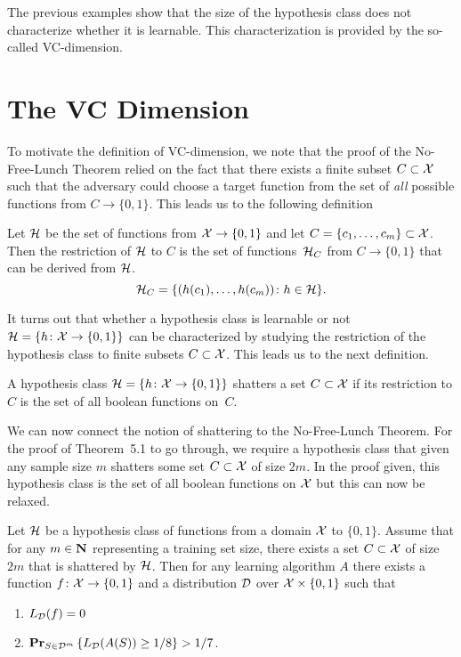 The previous examples show that the size of the hypothesis class does not characterize
whether it is learnable. This characterization is provided by the so-called VC-dimension.

\section{The VC Dimension}

To motivate the definition of VC-dimension, we note that the proof of the No-Free-Lunch
Theorem relied on the fact that there exists a finite subset $C \subset \mathcal{X}$ such
that the adversary could choose a target function from the set of \emph{all} possible
functions from $C \rightarrow \{0, 1\}$. This leads us to the following
definition
\begin{definition} Let $\mathcal{H}$ be the
set of functions from $\mathcal{X} \rightarrow \{0, 1\}$ and let
$C = \{c_1, \ldots, c_m\} \subset \mathcal{X}$. Then
the restriction of $\mathcal{H}$ to $C$ is the set of functions~$\mathcal{H}_C$
from $C \to \{0, 1\}$  that can be derived from $\mathcal{H}$.
\[
    \mathcal{H}_C = \{(h(c_1), \ldots, h(c_m)) \colon h \in \mathcal{H}\}.
\]
\end{definition}

It turns out that whether a hypothesis class is learnable or not
$\mathcal{H} = \{h \colon \mathcal{X} \rightarrow \{0, 1\} \}$ can be characterized
by studying the restriction of the hypothesis class to finite subsets
$C \subset \mathcal{X}$. This leads us to the next definition.
\begin{definition}[Shattering]
A hypothesis class $\mathcal{H} = \{h \colon \mathcal{X} \rightarrow \{0, 1\} \}$ shatters
a set $C \subset \mathcal{X}$ if its restriction to $C$ is the set of all boolean functions
on~$C$.
\end{definition}

We can now connect the notion of shattering to the No-Free-Lunch Theorem. For the
proof of Theorem~5.1 to go through, we require a hypothesis class that given
any sample size $m$ shatters some set $C \subset \mathcal{X}$ of size $2m$. In the proof
given, this hypothesis class is the set of all boolean functions on $\mathcal{X}$ but
this can now be relaxed.
\begin{corollary} \label{cor:no_free_lunch}
Let $\mathcal{H}$ be a hypothesis class of functions from a domain $\mathcal{X}$ to $\{0, 1\}$.
Assume that for any $m \in \mathbf{N}$ representing a training set size, there exists a
set $C \subset \mathcal{X}$ of size $2m$ that is shattered by $\mathcal{H}$. Then
for any learning algorithm $A$ there exists a function
$f \colon \mathcal{X} \rightarrow \{0, 1\}$ and a distribution $\mathcal{D}$ over
$\mathcal{X} \times \{0, 1\}$ such that
\begin{enumerate}
    \item $L_{\mathcal{D}} (f) = 0$
    \item $\mathbf{Pr}_{S \in \mathcal{D}^m} \left \{ L_{\mathcal{D}} (A(S)) \geq 1/ 8 \right \} > 1/7$.
\end{enumerate}
\end{corollary}

